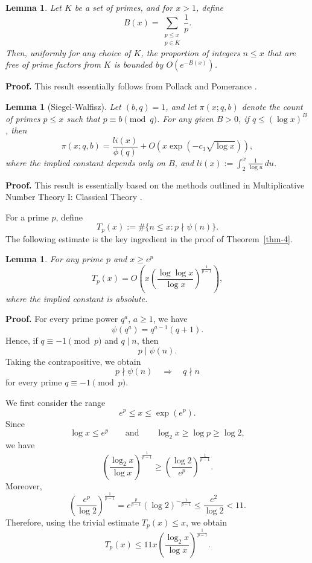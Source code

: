 \documentclass{article}
\newtheorem{lemma}[theorem]{Lemma}
\theoremstyle{remark}
\begin{document}
\begin{lemma}\label{sieve-lemma} Let $K$ be a set of primes, and for $x > 1$, define \begin{equation*} B(x) = \sum_{\substack{p \leq x \\ p \in K}} \frac{1}{p}. \end{equation*} Then, uniformly for any choice of $K$, the proportion of integers $n \leq x$ that are free of prime factors from $K$ is bounded by $O\left(e^{-B(x)}\right)$. 
\end{lemma}
\textbf{Proof.} This result essentially follows from Pollack and Pomerance \cite[Lemma 3]{pollack}.


\begin{lemma}[Siegel-Walfisz]\label{siegel}
    Let $(b, q) = 1$, and let $\pi(x; q, b)$ denote the count of primes \( p \leq x \) such that \( p \equiv b \pmod{q} \). For any given \( B > 0 \), if \( q \leq (\log x)^B \), then
    \begin{equation*}
        \pi(x; q, b) = \frac{li(x)}{\phi(q)} + O\left(x \exp(-c_3 \sqrt{\log x})\right),
    \end{equation*}
    where the implied constant depends only on \( B \), and \( li(x) := \int_2^x \frac{1}{\log u} \, du \).
   \end{lemma} 
\textbf{Proof.} This result is essentially based on the methods outlined in Multiplicative Number Theory I: Classical Theory \cite[Corollary 11.21]{Montgomery}. 


For a prime \(p\), define
\[
T_p(x):=\#\{n\le x:p\nmid\psi(n)\}.
\]
The following estimate is the key ingredient in the proof of
Theorem~\ref{thm-4}.

\begin{lemma}\label{main1-lemma}
    For any prime $p$ and $x\geq e^p$
\begin{equation*}
    T_p(x) = O\left(x \left(\frac{\log\log x}{\log x}\right)^{\frac{1}{p-1}}\right),
\end{equation*}
where the implied constant is absolute.
\end{lemma}

\textbf{Proof.} 
For every prime power \(q^a\), \(a\ge1\), we have
\[
\psi(q^a)=q^{a-1}(q+1).
\]
Hence, if \(q\equiv-1\pmod p\) and \(q\mid n\), then
\[
p\mid\psi(n).
\]
Taking the contrapositive, we obtain
\[
p\nmid\psi(n)
\quad\Longrightarrow\quad
q\nmid n
\]
for every prime \(q\equiv-1\pmod p\).

We first consider the range
\[
e^p\le x\le\exp(e^p).
\]
Since
\[
\log x\le e^p
\qquad\text{and}\qquad
\log_2x\ge\log p\ge\log2,
\]
we have
\[
\left(
\frac{\log_2x}{\log x}
\right)^{\frac1{p-1}}
\ge
\left(
\frac{\log2}{e^p}
\right)^{\frac1{p-1}}.
\]
Moreover,
\[
\left(
\frac{e^p}{\log2}
\right)^{\frac1{p-1}}
=
e^{\frac{p}{p-1}}
(\log2)^{-\frac1{p-1}}
\le
\frac{e^2}{\log2}<11.
\]
Therefore, using the trivial estimate \(T_p(x)\le x\), we obtain
\[
T_p(x)
\le
11x
\left(
\frac{\log_2x}{\log x}
\right)^{\frac1{p-1}}.
\]
\end{document}
